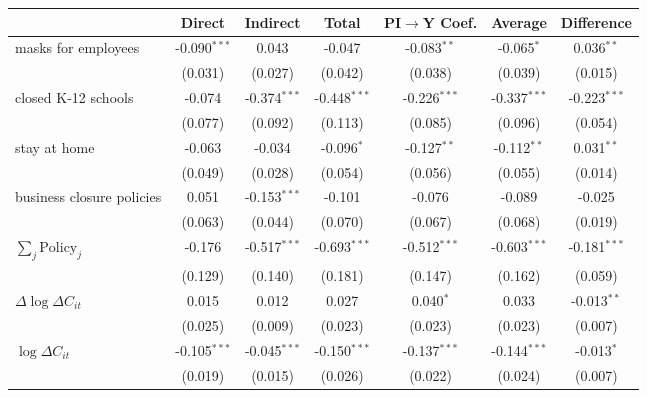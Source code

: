 
\begin{tabular}{lccccc|>{}c}
\toprule
  & Direct & Indirect & Total & PI$\to$Y Coef. & Average & Difference\\
\midrule
masks for employees & -0.090$^{***}$ & 0.043 & -0.047 & -0.083$^{**}$ & -0.065$^{*}$ & 0.036$^{**}$\\
 & (0.031) & (0.027) & (0.042) & (0.038) & (0.039) & (0.015)\\
closed K-12 schools & -0.074 & -0.374$^{***}$ & -0.448$^{***}$ & -0.226$^{***}$ & -0.337$^{***}$ & -0.223$^{***}$\\
 & (0.077) & (0.092) & (0.113) & (0.085) & (0.096) & (0.054)\\
stay at home & -0.063 & -0.034 & -0.096$^{*}$ & -0.127$^{**}$ & -0.112$^{**}$ & 0.031$^{**}$\\
 & (0.049) & (0.028) & (0.054) & (0.056) & (0.055) & (0.014)\\
business closure policies & 0.051 & -0.153$^{***}$ & -0.101 & -0.076 & -0.089 & -0.025\\
 & (0.063) & (0.044) & (0.070) & (0.067) & (0.068) & (0.019)\\
$\sum_j \mathrm{Policy}_j$ & -0.176 & -0.517$^{***}$ & -0.693$^{***}$ & -0.512$^{***}$ & -0.603$^{***}$ & -0.181$^{***}$\\
 & (0.129) & (0.140) & (0.181) & (0.147) & (0.162) & (0.059)\\
$\Delta \log \Delta C_{it}$ & 0.015 & 0.012 & 0.027 & 0.040$^{*}$ & 0.033 & -0.013$^{**}$\\
 & (0.025) & (0.009) & (0.023) & (0.023) & (0.023) & (0.007)\\
$\log \Delta C_{it}$ & -0.105$^{***}$ & -0.045$^{***}$ & -0.150$^{***}$ & -0.137$^{***}$ & -0.144$^{***}$ & -0.013$^{*}$\\
 & (0.019) & (0.015) & (0.026) & (0.022) & (0.024) & (0.007)\\
\bottomrule
\end{tabular}